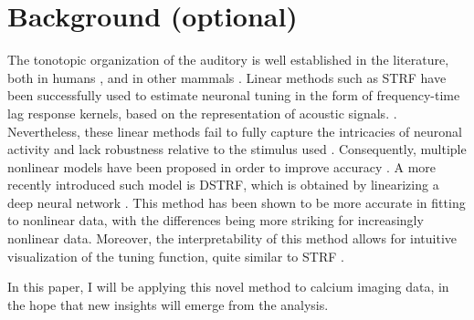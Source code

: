 \chapter{Background (optional)}\label{background}
The tonotopic organization of the auditory is well established in the literature, both in humans \parencite{saenzTonotopicMappingHuman2014}, and in other mammals \parencite{realeTonotopicOrganizationAuditory1980,bizleyFunctionalOrganizationFerret2005}. Linear methods such as STRF have been successfully used to estimate neuronal tuning in the form of frequency-time lag response kernels, based on the representation of acoustic signals. \parencite{aertsenSpectrotemporalReceptiveFields1980a}. Nevertheless, these linear methods fail to fully capture the intricacies of neuronal activity and lack robustness relative to the stimulus used \parencite{ahrensNonlinearitiesContextualInfluences2008}. Consequently, multiple nonlinear models have been proposed in order to improve accuracy \parencite{meyerModelsNeuronalStimulusResponse2017}. A more recently introduced such model is DSTRF, which is obtained by linearizing a deep neural network \parencite{keshishianEstimatingInterpretingNonlinear2020}. This method has been shown to be more accurate in fitting to nonlinear data, with the differences being more striking for increasingly nonlinear data. Moreover, the interpretability of this method allows for intuitive visualization of the tuning function, quite similar to STRF \parencite{keshishianEstimatingInterpretingNonlinear2020}.

In this paper, I will be applying this novel method to calcium imaging data, in the hope that new insights will emerge from the analysis.